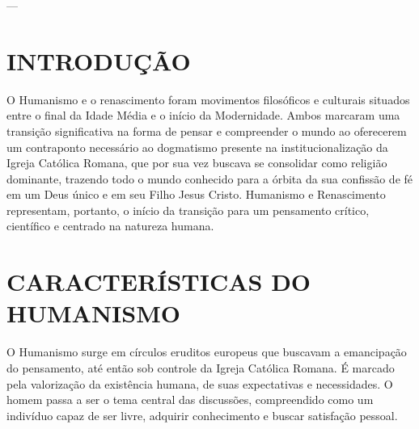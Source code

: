 \documentclass[
    article,            %
	12pt,				%
	oneside,			%
	a4paper,			%
	english,			%
	french,				%
	spanish,			%
	brazil				%
	]{abntex2}
\begin{document}



\imprimircapa

\imprimirfolhaderosto

---
\tableofcontents*
\cleardoublepage

\textual

\section{INTRODUÇÃO}
O Humanismo e o renascimento foram movimentos filosóficos e culturais situados entre o final da Idade Média e o início da Modernidade. Ambos marcaram uma transição significativa na forma de pensar e compreender o mundo ao oferecerem um contraponto necessário ao dogmatismo presente na institucionalização da Igreja Católica Romana, que por sua vez buscava se consolidar como religião dominante, trazendo todo o mundo conhecido para a órbita da sua confissão de fé em um Deus único e em seu Filho Jesus Cristo. Humanismo e Renascimento representam, portanto, o início da transição para um pensamento crítico, científico e centrado na natureza humana.

\section{CARACTERÍSTICAS DO HUMANISMO}

O Humanismo surge em círculos eruditos europeus que buscavam a emancipação do pensamento, até então sob controle da Igreja Católica Romana. É marcado pela valorização da existência humana, de suas expectativas e necessidades. O homem passa a ser o tema central das discussões, compreendido como um indivíduo capaz de ser livre, adquirir conhecimento e buscar satisfação pessoal.
\end{document}
